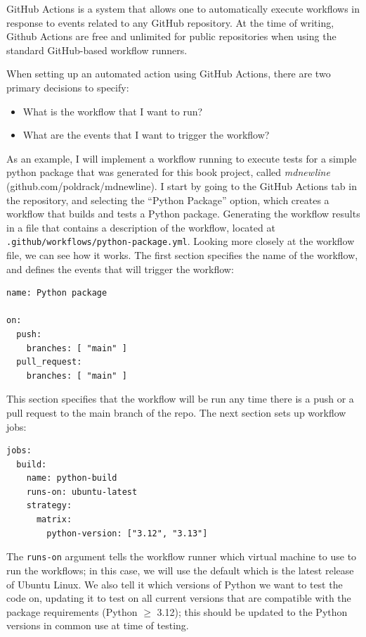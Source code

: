 GitHub Actions is a system that allows one to automatically execute workflows in response to events related to any GitHub repository.
At the time of writing, Github Actions are free and unlimited for public repositories when using the standard GitHub-based workflow runners.

When setting up an automated action using GitHub Actions, there are two primary decisions to specify:

\begin{itemize}
\item What is the workflow that I want to run?
\item What are the events that I want to trigger the workflow?
\end{itemize}

As an example, I will implement a workflow running to execute tests for a simple python package that was generated for this book project, called \textit{mdnewline} (github.com/poldrack/mdnewline).
I start by going to the GitHub Actions tab in the repository, and selecting the ``Python Package'' option, which creates a workflow that builds and tests a Python package.
Generating the workflow results in a file that contains a description of the workflow, located at \texttt{.github/workflows/python-package.yml}.
Looking more closely at the workflow file, we can see how it works.
The first section specifies the name of the workflow, and defines the events that will trigger the workflow:

\begin{lstlisting}[style=yaml]
name: Python package

on:
  push:
    branches: [ "main" ]
  pull_request:
    branches: [ "main" ]
\end{lstlisting}

This section specifies that the workflow will be run any time there is a push or a pull request to the main branch of the repo.
The next section sets up workflow jobs:

\begin{lstlisting}[style=yaml]
jobs:
  build:
    name: python-build
    runs-on: ubuntu-latest
    strategy:
      matrix:
        python-version: ["3.12", "3.13"]
\end{lstlisting}

The \texttt{runs-on} argument tells the workflow runner which virtual machine to use to run the workflows; in this case, we will use the default which is the latest release of Ubuntu Linux.
We also tell it which versions of Python we want to test the code on, updating it to test on all current versions that are compatible with the package requirements (Python $\geq$ 3.12); this should be updated to the Python versions in common use at time of testing.

